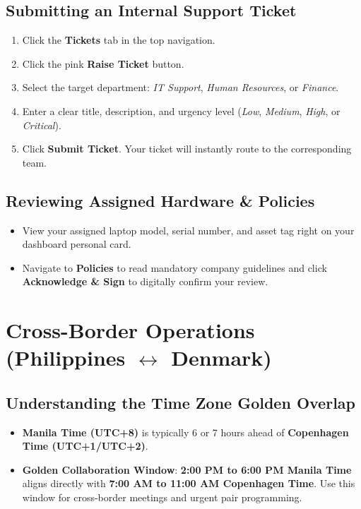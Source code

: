 \documentclass[a4paper,11pt]{article}
\begin{document}
\subsection{Submitting an Internal Support Ticket}
\begin{enumerate}
    \item Click the \textbf{Tickets} tab in the top navigation.
    \item Click the pink \textbf{Raise Ticket} button.
    \item Select the target department: \textit{IT Support}, \textit{Human Resources}, or \textit{Finance}.
    \item Enter a clear title, description, and urgency level (\textit{Low}, \textit{Medium}, \textit{High}, or \textit{Critical}).
    \item Click \textbf{Submit Ticket}. Your ticket will instantly route to the corresponding team.
\end{enumerate}

\subsection{Reviewing Assigned Hardware \& Policies}
\begin{itemize}
    \item View your assigned laptop model, serial number, and asset tag right on your dashboard personal card.
    \item Navigate to \textbf{Policies} to read mandatory company guidelines and click \textbf{Acknowledge \& Sign} to digitally confirm your review.
\end{itemize}

\section{Cross-Border Operations (Philippines $\leftrightarrow$ Denmark)}

\subsection{Understanding the Time Zone Golden Overlap}
\begin{itemize}
    \item \textbf{Manila Time (UTC+8)} is typically 6 or 7 hours ahead of \textbf{Copenhagen Time (UTC+1/UTC+2)}.
    \item \textbf{Golden Collaboration Window}: \textbf{2:00 PM to 6:00 PM Manila Time} aligns directly with \textbf{7:00 AM to 11:00 AM Copenhagen Time}. Use this window for cross-border meetings and urgent pair programming.
\end{itemize}
\end{document}
